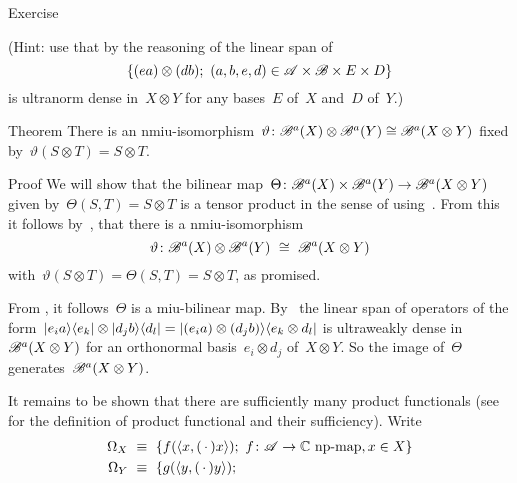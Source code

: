 \begin{parsec}
\begin{point}{Exercise}
\begin{enumerate}
    (Hint:
    use that by the reasoning of 
    the linear
    span of
    \begin{equation*}
    \{ (e a) \otimes (d b); \ (a,b,e,d) \in \mathscr{A} \times \mathscr{B}
                    \times E \times D\}
    \end{equation*}
        is ultranorm dense in~$X \otimes Y$
        for any bases~$E$ of~$X$ and~$D$ of~$Y$.)

\end{enumerate}
\end{point}
\begin{point}{Theorem}%
There is an
    nmiu-isomorphism~$\vartheta\colon \mathscr{B}^a(X) \otimes \mathscr{B}^a(Y) \cong \mathscr{B}^a(X \otimes Y)$
    fixed by~$\vartheta(S\otimes T) = S \otimes T$.
\begin{point}{Proof}%
We will show that
    the bilinear map~$\Theta \colon 
            \mathscr{B}^a(X) \times \mathscr{B}^a(Y) \to
    \mathscr{B}^a(X \otimes Y)$
    given by~$\Theta(S,T) = S \otimes T$
    is a tensor product in the sense of 
    using~.
From this it follows
    by~,
    that there is a
    nmiu-isomorphism
    \begin{equation*}
    \vartheta\colon \scrB^a(X) \otimes \scrB^a(Y) \ \cong\  \scrB^a(X \otimes Y)
    \end{equation*}
    with~$\vartheta(S\otimes T) = \Theta(S , T) = S \otimes T$, as promised.
\begin{point}%
From , it follows~$\Theta$ is a miu-bilinear map.
By~
    the linear span of operators of the form~$
        \left|e_i a\right>\!\left<e_k\right| \otimes \left|d_j b \right>\!\left<d_l\right|
        = \left|(e_i a) \otimes (d_j b)\right>\!\left<e_k \otimes d_l\right| $
        is ultraweakly dense in~$\mathscr{B}^a(X \otimes Y)$
        for an orthonormal basis~$e_i \otimes d_j$ of~$X \otimes Y$.
        So the image of~$\Theta$ generates~$\mathscr{B}^a(X\otimes Y)$.
\begin{point}%
    It remains to be shown that there are sufficiently many product functionals
    (see~ for the definition of product functional
    and their sufficiency).
    Write
    \begin{align*}
        \Omega_X &\ \equiv \ 
                    \{ f(\langle x, (\,\cdot\,) x \rangle);
                    \ f \colon \scrA \to \C \text{ np-map}, x\in X \} \\
        \Omega_Y& \  \equiv\ 
                    \{ g(\langle y, (\,\cdot\,) y \rangle);

\end{align*}
\end{point}
\end{point}
\end{point}
\end{point}
\end{parsec}
